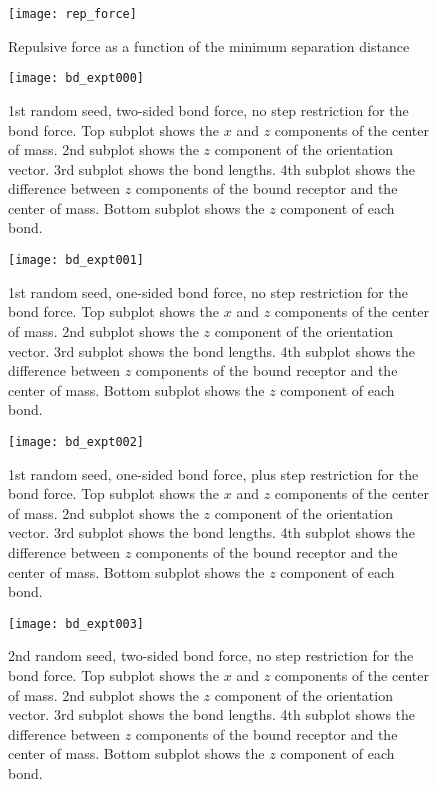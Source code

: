 \documentclass{article}
\begin{document}
\begin{figure}[h]
  \centering
  \texttt{[image: rep\_force]}
  \caption{Repulsive force as a function of the minimum separation
    distance}
  \label{fig:sep}
\end{figure}

\begin{figure}
  \centering
  \texttt{[image: bd\_expt000]}
  \caption{1st random seed, two-sided bond force, no step restriction
    for the bond force. Top subplot shows the $x$ and $z$ components
    of the center of mass. 2nd subplot shows the $z$ component of the
    orientation vector. 3rd subplot shows the bond lengths. 4th
    subplot shows the difference between $z$ components of the bound
    receptor and the center of mass. Bottom subplot shows the $z$
    component of each bond.}
  \label{fig:fig1}
\end{figure}

\begin{figure}
  \centering
  \texttt{[image: bd\_expt001]}
  \caption{1st random seed, one-sided bond force, no step restriction
    for the bond force. Top subplot shows the $x$ and $z$ components
    of the center of mass. 2nd subplot shows the $z$ component of the
    orientation vector. 3rd subplot shows the bond lengths. 4th
    subplot shows the difference between $z$ components of the bound
    receptor and the center of mass. Bottom subplot shows the $z$
    component of each bond.}
  \label{fig:fig2}
\end{figure}

\begin{figure}
  \centering
  \texttt{[image: bd\_expt002]}
  \caption{1st random seed, one-sided bond force, plus step
    restriction for the bond force. Top subplot shows the $x$ and $z$
    components of the center of mass. 2nd subplot shows the $z$
    component of the orientation vector. 3rd subplot shows the bond
    lengths. 4th subplot shows the difference between $z$ components
    of the bound receptor and the center of mass. Bottom subplot shows
    the $z$ component of each bond.}
  \label{fig:fig3}
\end{figure}

\begin{figure}
  \centering
  \texttt{[image: bd\_expt003]}
  \caption{2nd random seed, two-sided bond force, no step restriction
    for the bond force. Top subplot shows the $x$ and $z$ components
    of the center of mass. 2nd subplot shows the $z$ component of the
    orientation vector. 3rd subplot shows the bond lengths. 4th
    subplot shows the difference between $z$ components of the bound
    receptor and the center of mass. Bottom subplot shows the $z$
    component of each bond.}
  \label{fig:fig4}
\end{figure}
\end{document}
